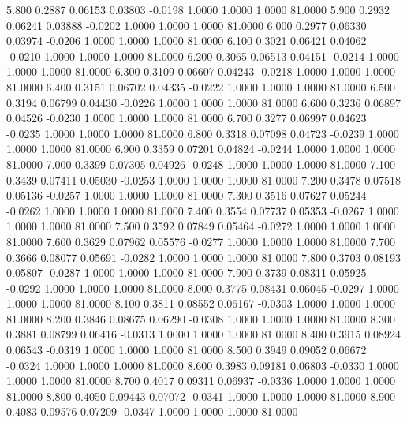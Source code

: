    5.800   0.2887   0.06153   0.03803  -0.0198   1.0000   1.0000   1.0000  81.0000
   5.900   0.2932   0.06241   0.03888  -0.0202   1.0000   1.0000   1.0000  81.0000
   6.000   0.2977   0.06330   0.03974  -0.0206   1.0000   1.0000   1.0000  81.0000
   6.100   0.3021   0.06421   0.04062  -0.0210   1.0000   1.0000   1.0000  81.0000
   6.200   0.3065   0.06513   0.04151  -0.0214   1.0000   1.0000   1.0000  81.0000
   6.300   0.3109   0.06607   0.04243  -0.0218   1.0000   1.0000   1.0000  81.0000
   6.400   0.3151   0.06702   0.04335  -0.0222   1.0000   1.0000   1.0000  81.0000
   6.500   0.3194   0.06799   0.04430  -0.0226   1.0000   1.0000   1.0000  81.0000
   6.600   0.3236   0.06897   0.04526  -0.0230   1.0000   1.0000   1.0000  81.0000
   6.700   0.3277   0.06997   0.04623  -0.0235   1.0000   1.0000   1.0000  81.0000
   6.800   0.3318   0.07098   0.04723  -0.0239   1.0000   1.0000   1.0000  81.0000
   6.900   0.3359   0.07201   0.04824  -0.0244   1.0000   1.0000   1.0000  81.0000
   7.000   0.3399   0.07305   0.04926  -0.0248   1.0000   1.0000   1.0000  81.0000
   7.100   0.3439   0.07411   0.05030  -0.0253   1.0000   1.0000   1.0000  81.0000
   7.200   0.3478   0.07518   0.05136  -0.0257   1.0000   1.0000   1.0000  81.0000
   7.300   0.3516   0.07627   0.05244  -0.0262   1.0000   1.0000   1.0000  81.0000
   7.400   0.3554   0.07737   0.05353  -0.0267   1.0000   1.0000   1.0000  81.0000
   7.500   0.3592   0.07849   0.05464  -0.0272   1.0000   1.0000   1.0000  81.0000
   7.600   0.3629   0.07962   0.05576  -0.0277   1.0000   1.0000   1.0000  81.0000
   7.700   0.3666   0.08077   0.05691  -0.0282   1.0000   1.0000   1.0000  81.0000
   7.800   0.3703   0.08193   0.05807  -0.0287   1.0000   1.0000   1.0000  81.0000
   7.900   0.3739   0.08311   0.05925  -0.0292   1.0000   1.0000   1.0000  81.0000
   8.000   0.3775   0.08431   0.06045  -0.0297   1.0000   1.0000   1.0000  81.0000
   8.100   0.3811   0.08552   0.06167  -0.0303   1.0000   1.0000   1.0000  81.0000
   8.200   0.3846   0.08675   0.06290  -0.0308   1.0000   1.0000   1.0000  81.0000
   8.300   0.3881   0.08799   0.06416  -0.0313   1.0000   1.0000   1.0000  81.0000
   8.400   0.3915   0.08924   0.06543  -0.0319   1.0000   1.0000   1.0000  81.0000
   8.500   0.3949   0.09052   0.06672  -0.0324   1.0000   1.0000   1.0000  81.0000
   8.600   0.3983   0.09181   0.06803  -0.0330   1.0000   1.0000   1.0000  81.0000
   8.700   0.4017   0.09311   0.06937  -0.0336   1.0000   1.0000   1.0000  81.0000
   8.800   0.4050   0.09443   0.07072  -0.0341   1.0000   1.0000   1.0000  81.0000
   8.900   0.4083   0.09576   0.07209  -0.0347   1.0000   1.0000   1.0000  81.0000
